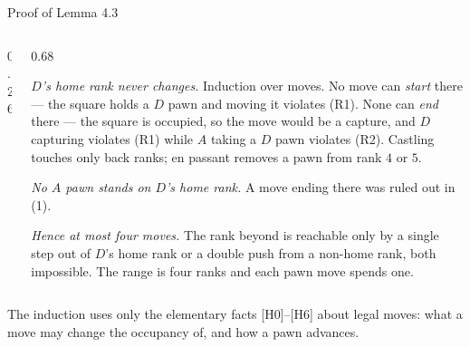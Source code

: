 \documentclass[aspectratio=169,10pt]{beamer}
\begin{document}
\begin{frame}{Proof of Lemma 4.3}
  \centering
  \vspace{0.15cm}
  \begin{columns}[c]
    \begin{column}{0.26\textwidth}\centering
      \fighomeranks
    \end{column}
    \begin{column}{0.68\textwidth}
      \begin{lcproof}
        \begin{lcsteps}
          \item \emph{$D$'s home rank never changes.} Induction over moves.
            No move can \emph{start} there --- the square holds a $D$ pawn
            and moving it violates (R1). None can \emph{end} there --- the
            square is occupied, so the move would be a capture, and $D$
            capturing violates (R1) while $A$ taking a $D$ pawn violates
            (R2). Castling touches only back ranks; en passant removes a
            pawn from rank $4$ or $5$.
          \item \emph{No $A$ pawn stands on $D$'s home rank.} A move ending
            there was ruled out in (1).
          \item \emph{Hence at most four moves.} The rank beyond is
            reachable only by a single step out of $D$'s home rank or a
            double push from a non-home rank, both impossible. The range is
            four ranks and each pawn move spends one. \qedhere
        \end{lcsteps}
      \end{lcproof}
    \end{column}
  \end{columns}
  \par\vspace{0.15cm}
  {\scriptsize\color{lcgrey}
   The induction uses only the elementary facts [H0]--[H6] about legal
   moves: what a move may change the occupancy of, and how a pawn advances.}
\end{frame}
\end{document}
